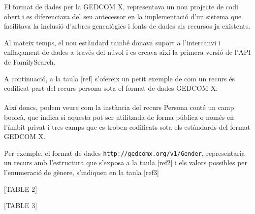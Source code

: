          El format de dades per la \gls{GEDCOM X}, representava un nou projecte de codi obert i es diferenciava del seu antecessor en la implementació d'un sistema que facilitava la inclusió d'arbres genealògics i fonts de dades als recursos ja existents.

         Al mateix temps, el nou estàndard també donava suport a l'intercanvi i enllaçament de dades a través del núvol i es creava així la primera versió de l'API de FamilySearch.

         A continuació, a la taula [ref] s'ofereix un petit exemple de com un recurs és codificat part del recurs persona sota el format de dades GEDCOM X.


         \paragraph{}
         Així doncs, podem veure com la instància del recurs Persona conté un camp booleà, que indica si aquesta pot ser utilitzada de forma pública o només en l'àmbit privat i tres camps que es troben codificats sota els estàndards del format GEDCOM X.

         Per exemple, el format de dades \verb|http://gedcomx.org/v1/Gender|, representaria un recurs amb l’estructura que s’exposa a la taula [ref2] i els valors possibles per l’enumeració de gènere, s’indiquen en la taula [ref3]

         [TABLE 2]

         [TABLE 3]

